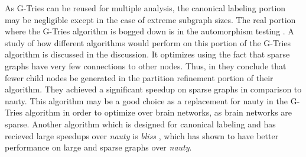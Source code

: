As G-Tries can be reused for multiple analysis, the canonical labeling portion may be negligible except in the case of extreme subgraph sizes. The real portion where the G-Tries algorithm is bogged down is in the automorphism testing \cite{li12}. A study of how different algorithms would perform on this portion of the G-Tries algorithm is discussed in the discussion. It optimizes using the fact that sparse graphs have very few connections to other nodes. Thus, in \cite{darga04} they conclude that fewer child nodes be generated in the partition refinement portion of their algorithm. They achieved a significant speedup on sparse graphs in comparison to nauty. This algorithm may be a good choice as a replacement for nauty in the G-Tries algorithm in order to optimize over brain networks, as brain networks are sparse. Another algorithm which is designed for canonical labeling and has recieved large speedups over \emph{nauty} is \emph{bliss} \cite{juntilla07}, which has shown to have better performance on large and sparse graphs over \emph{nauty}.